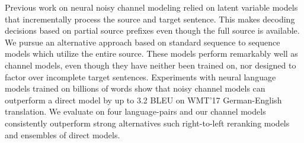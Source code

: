 Previous work on neural noisy channel modeling relied on latent variable models that incrementally process the source and target sentence. This makes decoding decisions based on partial source prefixes even though the full source is available. We pursue an alternative approach based on standard sequence to sequence models which utilize the entire source. These models perform remarkably well as channel models, even though they have neither been trained on, nor designed to factor over incomplete target sentences.
Experiments with neural language models trained on billions of words show that noisy channel models can outperform a direct model by up to 3.2 BLEU on WMT'17 German-English translation. We evaluate on four language-pairs and our channel models consistently outperform strong alternatives such right-to-left reranking models and ensembles of direct models.